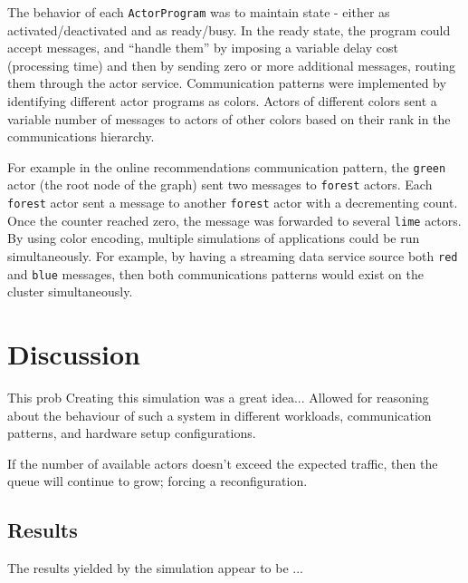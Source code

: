 \documentclass[conference,twocolumn,10pt]{IEEEtran}
\begin{document}
The behavior of each \texttt{ActorProgram} was to maintain state - either as activated/deactivated and as ready/busy. In the ready state, the program could accept messages, and ``handle them'' by imposing a variable delay cost (processing time) and then by sending zero or more additional messages, routing them through the actor service.  Communication patterns were implemented by identifying different actor programs as colors. Actors of different colors sent a variable number of messages to actors of other colors based on their rank in the communications hierarchy.

For example in the online recommendations communication pattern, the \texttt{green} actor (the root node of the graph) sent two messages to \texttt{forest} actors. Each \texttt{forest} actor sent a message to another \texttt{forest} actor with a decrementing count. Once the counter reached zero, the message was forwarded to several \texttt{lime} actors. By using color encoding, multiple simulations of applications could be run simultaneously. For example, by having a streaming data service source both \texttt{red} and \texttt{blue} messages, then both communications patterns would exist on the cluster simultaneously.

\section{Discussion}



This prob
Creating this simulation was a great idea...
Allowed for reasoning about the behaviour of such a system in different workloads, communication patterns, and hardware setup configurations.




If the number of available actors doesn't exceed the expected traffic, then the queue will continue to grow; forcing a reconfiguration.

\subsection{Results}

The results yielded by the simulation appear to be ...
\end{document}
